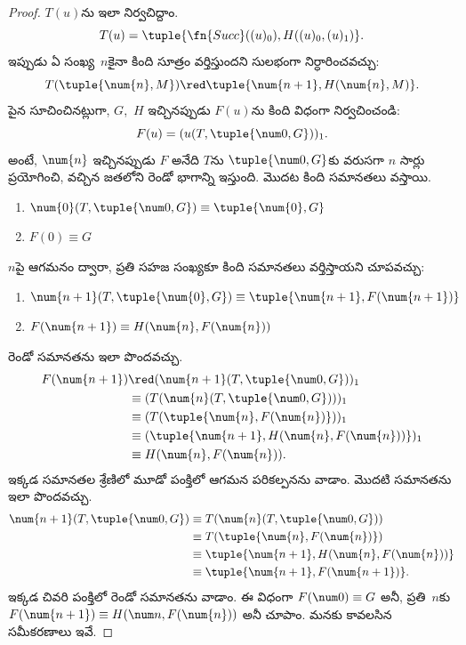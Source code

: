 \documentclass[../../../include/open-logic-section]{subfiles}
\begin{document}
\begin{proof}
$T(u)$ను ఇలా నిర్వచిద్దాం.
\[
T(u) = \tuple{\fn{Succ}((u)_0), H((u)_0,(u)_1)}.
\]
ఇప్పుడు ఏ సంఖ్య~$n$కైనా కింది సూత్రం వర్తిస్తుందని సులభంగా నిర్ధారించవచ్చు:
\[
T(\tuple{\num{n}, M}) \red \tuple{\num{n+1}, H(\num{n}, M)}.
\]
పైన సూచించినట్లుగా, $G$,~$H$ ఇచ్చినప్పుడు $F(u)$ను కింది విధంగా
నిర్వచించండి:
\[
F(u) = (u(T,\tuple{\num 0, G}))_1.
\]
అంటే, $\num{n}$ ఇచ్చినప్పుడు $F$ అనేది $T$ను $\tuple{\num 0, G}$కు
వరుసగా $n$ సార్లు ప్రయోగించి, వచ్చిన జతలోని రెండో భాగాన్ని ఇస్తుంది.
మొదట కింది సమానతలు వస్తాయి.
\begin{enumerate}
\item $\num{0} (T, \tuple{\num 0, G}) \equiv \tuple{\num{0}, G}$
\item $F(\num{0}) \equiv G$
\end{enumerate}
$n$పై ఆగమనం ద్వారా, ప్రతి సహజ సంఖ్యకూ కింది సమానతలు వర్తిస్తాయని చూపవచ్చు:
\begin{enumerate}
\item $\num{n+1}(T, \tuple{\num{0}, G}) \equiv \tuple{\num{n+1}, F(\num{n+1})}$
\item $F(\num{n+1}) \equiv H(\num{n}, F(\num{n}))$
\end{enumerate}
రెండో సమానతను ఇలా పొందవచ్చు.
\begin{align*}
F(\num{n+1}) & \red (\num{n+1}(T, \tuple{\num 0, G}))_1 \\
& \equiv (T(\num{n} (T, \tuple{\num 0, G})))_1 \\
& \equiv (T(\tuple{\num{n}, F(\num{n})}))_1 \\
& \equiv (\tuple{\num{n+1}, H(\num{n}, F(\num{n}))})_1 \\
& \equiv H(\num{n}, F(\num{n})).
\end{align*}
ఇక్కడ సమానతల శ్రేణిలో మూడో పంక్తిలో ఆగమన పరికల్పనను వాడాం. మొదటి
సమానతను ఇలా పొందవచ్చు.
\begin{align*}
\num{n+1} (T, \tuple{\num 0, G}) &
\equiv T(\num{n} (T, \tuple{\num 0, G})) \\
& \equiv T( \tuple{\num{n}, F(\num{n})}) \\
& \equiv \tuple{\num{n+1}, H(\num{n}, F(\num{n}))} \\
& \equiv \tuple{\num{n+1}, F(\num{n+1})}.
\end{align*}
ఇక్కడ చివరి పంక్తిలో రెండో సమానతను వాడాం. ఈ విధంగా
$F(\num 0) \equiv G$ అనీ, ప్రతి~$n$కు $F(\num {n+1}) \equiv H(\num
n, F(\num{n}))$ అనీ చూపాం. మనకు కావలసిన సమీకరణాలు ఇవే.
%
\end{proof}
\end{document}
